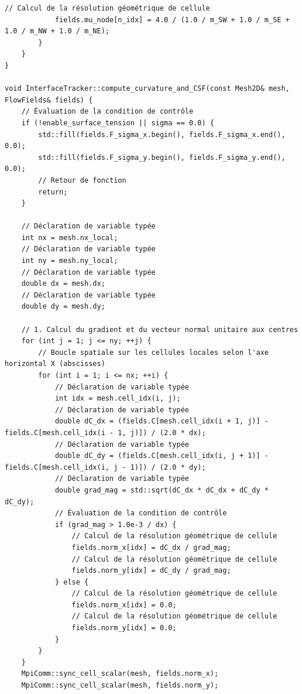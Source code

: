 \documentclass[10pt,a4paper,oneside]{book}
\begin{document}
\begin{lstlisting}[language={[11]C++}]
            // Calcul de la résolution géométrique de cellule
            fields.mu_node[n_idx] = 4.0 / (1.0 / m_SW + 1.0 / m_SE + 1.0 / m_NW + 1.0 / m_NE);
        }
    }
}

void InterfaceTracker::compute_curvature_and_CSF(const Mesh2D& mesh, FlowFields& fields) {
    // Évaluation de la condition de contrôle
    if (!enable_surface_tension || sigma == 0.0) {
        std::fill(fields.F_sigma_x.begin(), fields.F_sigma_x.end(), 0.0);
        std::fill(fields.F_sigma_y.begin(), fields.F_sigma_y.end(), 0.0);
        // Retour de fonction
        return;
    }

    // Déclaration de variable typée
    int nx = mesh.nx_local;
    // Déclaration de variable typée
    int ny = mesh.ny_local;
    // Déclaration de variable typée
    double dx = mesh.dx;
    // Déclaration de variable typée
    double dy = mesh.dy;

    // 1. Calcul du gradient et du vecteur normal unitaire aux centres
    for (int j = 1; j <= ny; ++j) {
        // Boucle spatiale sur les cellules locales selon l'axe horizontal X (abscisses)
        for (int i = 1; i <= nx; ++i) {
            // Déclaration de variable typée
            int idx = mesh.cell_idx(i, j);
            // Déclaration de variable typée
            double dC_dx = (fields.C[mesh.cell_idx(i + 1, j)] - fields.C[mesh.cell_idx(i - 1, j)]) / (2.0 * dx);
            // Déclaration de variable typée
            double dC_dy = (fields.C[mesh.cell_idx(i, j + 1)] - fields.C[mesh.cell_idx(i, j - 1)]) / (2.0 * dy);
            // Déclaration de variable typée
            double grad_mag = std::sqrt(dC_dx * dC_dx + dC_dy * dC_dy);
            // Évaluation de la condition de contrôle
            if (grad_mag > 1.0e-3 / dx) {
                // Calcul de la résolution géométrique de cellule
                fields.norm_x[idx] = dC_dx / grad_mag;
                // Calcul de la résolution géométrique de cellule
                fields.norm_y[idx] = dC_dy / grad_mag;
            } else {
                // Calcul de la résolution géométrique de cellule
                fields.norm_x[idx] = 0.0;
                // Calcul de la résolution géométrique de cellule
                fields.norm_y[idx] = 0.0;
            }
        }
    }
    MpiComm::sync_cell_scalar(mesh, fields.norm_x);
    MpiComm::sync_cell_scalar(mesh, fields.norm_y);


\end{lstlisting}
\end{document}
